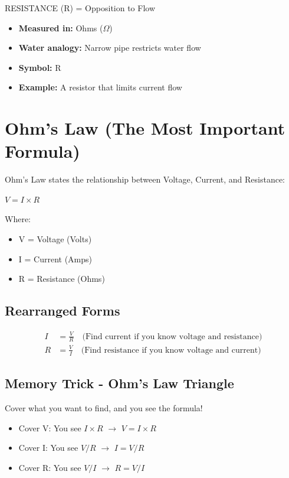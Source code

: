 \documentclass[11pt,letterpaper]{article}
\begin{document}
\vspace{0.5cm}

\begin{conceptbox}{RESISTANCE (R) = Opposition to Flow}
\begin{itemize}
  \item \textbf{Measured in:} Ohms ($\Omega$)
  \item \textbf{Water analogy:} Narrow pipe restricts water flow
  \item \textbf{Symbol:} R
  \item \textbf{Example:} A resistor that limits current flow
\end{itemize}
\end{conceptbox}

\section{Ohm's Law (The Most Important Formula)}

Ohm's Law states the relationship between Voltage, Current, and Resistance:

\begin{formulabox}
$V = I \times R$
\end{formulabox}

Where:
\begin{itemize}
  \item V = Voltage (Volts)
  \item I = Current (Amps)
  \item R = Resistance (Ohms)
\end{itemize}

\subsection{Rearranged Forms}

\begin{align*}
I &= \frac{V}{R} \quad \text{(Find current if you know voltage and resistance)}\\
R &= \frac{V}{I} \quad \text{(Find resistance if you know voltage and current)}
\end{align*}

\subsection{Memory Trick - Ohm's Law Triangle}

Cover what you want to find, and you see the formula!
\begin{itemize}
  \item Cover V: You see $I \times R$ $\rightarrow$ $V = I \times R$
  \item Cover I: You see $V / R$ $\rightarrow$ $I = V / R$
  \item Cover R: You see $V / I$ $\rightarrow$ $R = V / I$
\end{itemize}
\end{document}

